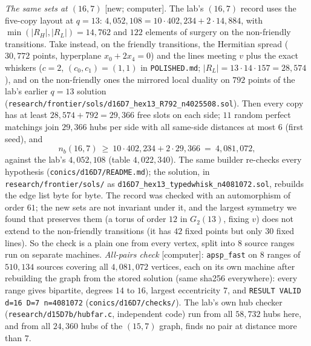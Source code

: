 \documentclass[11pt]{amsart}
\theoremstyle{definition}
\theoremstyle{remark}
\newcommand{\status}[1]{\textup{[#1]}}
\begin{document}
\emph{The same sets at $(16,7)$} \status{new; computer}. The lab's $(16,7)$ record uses the five-copy layout at
$q=13$: $4{,}052{,}108=10\cdot402{,}234+2\cdot14{,}884$, with $\min(|R_H|,|R_L|)=14{,}762$ and $122$ elements of
surgery on the non-friendly transitions. Take instead, on the friendly transitions, the Hermitian spread
($30{,}772$ points, hyperplane $x_0+2x_4=0$) and the lines meeting $v$ plus the exact whiskers ($c=2$,
$(c_0,c_1)=(1,1)$ in \texttt{POLISHED.md}; $|R_L|=13\cdot14\cdot157=28{,}574$), and on the non-friendly ones the
mirrored local duality on $792$ points of the lab's earlier $q=13$ solution
(\texttt{research/frontier/sols/d16D7\_hex13\_R792\_n4025508.sol}). Then every copy has at least $28{,}574+792=29{,}366$
free slots on each side; $11$ random perfect matchings join $29{,}366$ hubs per side with all same-side distances at
most $6$ (first seed), and
$$n_b(16,7)\ \ge\ 10\cdot402{,}234+2\cdot29{,}366\ =\ 4{,}081{,}072,$$
against the lab's $4{,}052{,}108$ (table $4{,}022{,}340$). The same builder re-checks every hypothesis
(\texttt{conics/d16D7/README.md}); the solution, in \texttt{research/frontier/sols/} as
\texttt{d16D7\_hex13\_typedwhisk\_n4081072.sol}, rebuilds the edge list byte for byte. The record was checked with an automorphism of order $61$; the new sets are not
invariant under it, and the largest symmetry we found that preserves them (a torus of order $12$ in $G_2(13)$, fixing
$v$) does not extend to the non-friendly transitions (it has $42$ fixed points but only $30$ fixed lines). So the check
is a plain one from every vertex, split into $8$ source ranges run on separate machines.
\emph{All-pairs check} \status{computer}: \texttt{apsp\_fast} on $8$ ranges of $510{,}134$ sources covering all
$4{,}081{,}072$ vertices, each on its own machine after rebuilding the graph from the stored solution (same sha256
everywhere): every range gives bipartite, degrees $14$ to $16$, largest eccentricity $7$, and
\texttt{RESULT VALID d=16 D=7 n=4081072} (\texttt{conics/d16D7/checks/}). The lab's own hub checker
(\texttt{research/d15D7b/hubfar.c}, independent code) run from all $58{,}732$ hubs here, and from all $24{,}360$ hubs of
the $(15,7)$ graph, finds no pair at distance more than $7$.
\end{document}
